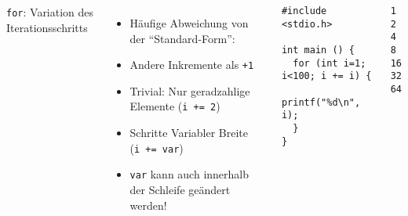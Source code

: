 \begin{frame}[fragile]
%
\begin{columns}[T]
\begin{Large}
{\texttt{for}: Variation des Iterationsschritts}
\vspace{6pt}
\end{Large}
%
\begin{itemize}
\item Häufige Abweichung von der \enquote{Standard-Form}:
\item Andere Inkremente als \texttt{+1}
\item Trivial: Nur geradzahlige Elemente  (\texttt{i += 2})
\item Schritte Variabler Breite \\
	(\texttt{i += var})
\item \texttt{var} kann auch innerhalb der Schleife geändert werden!
\end{itemize}
%
\vspace{-15pt}
\begin{codebox}
\begin{verbatim}
#include <stdio.h>

int main () {
  for (int i=1; i<100; i += i) {
    printf("%d\n", i);
  }
}
\end{verbatim}
\end{codebox}
%
\begin{cmdbox}[Ausgabe]
\begin{verbatim}
1
2
4
8
16
32
64
\end{verbatim}
\end{cmdbox}
%
\end{columns}
%
\end{frame}


